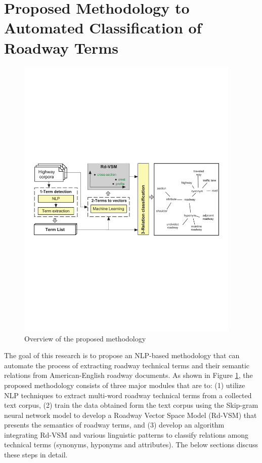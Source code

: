\documentclass[Journal, BackFigs,NoLists, DoubleSpace]{ascelike}%
\begin{document}
\section{Proposed Methodology to Automated Classification of Roadway Terms} \label{sec:RoadLex}
%
\begin{figure}[t]
	\centering
	\includegraphics[width=0.95\textwidth]{Figure1_overview_methodology}
	\caption{Overview of the proposed methodology}
	\label{fig:framework}
\end{figure}
%
The goal of this research is to propose an NLP-based methodology that can automate the process of extracting roadway technical terms and their semantic relations from American-English roadway documents. As shown in Figure \ref{fig:framework}, the proposed methodology consists of three major modules that are to: (1) utilize NLP techniques to extract multi-word roadway technical terms from a collected text corpus, (2) train the data obtained form the text corpus using the Skip-gram neural network model \cite{mikolov13a} to develop a Roadway Vector Space Model (Rd-VSM) that presents the semantics of roadway terms, and (3) develop an algorithm integrating Rd-VSM and various linguistic patterns to classify relations among technical terms (synonyms, hyponyms and attributes). The below sections discuss these steps in detail.
%
\end{document}
